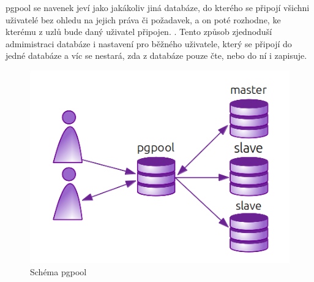 pgpool se navenek jeví jako jakákoliv jiná databáze, do kterého se připojí všichni uživatelé bez ohledu na jejich práva či požadavek, a on poté rozhodne, ke kterému z uzlů bude daný uživatel připojen. \citep{Boszormenyi2013}. Tento způsob zjednoduší admimistraci databáze i nastavení pro běžného uživatele, který se připojí do jedné databáze a víc se nestará, zda z databáze pouze čte, nebo do ní i zapisuje. 

      \begin{figure}[H]
        \centering
        \includegraphics[scale=1]{../../../grafy/obr/schema_pgpool.png}
        \caption{Schéma pgpool}
        \label{opgpool}
      \end{figure}

